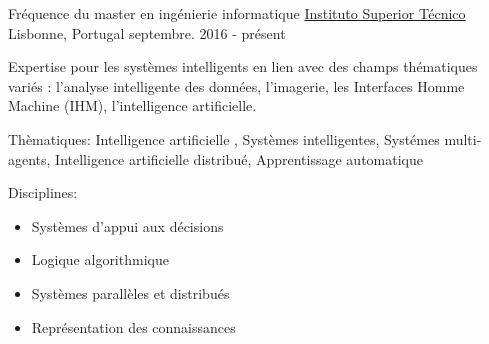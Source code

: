 


\begin{cventries}


\cventry
{Fréquence du master en ingénierie informatique} %
{\href{https://tecnico.ulisboa.pt/en/}{Instituto Superior Técnico}} %
{Lisbonne, Portugal} %
{septembre. 2016 - présent} %
{  %
\begin{cvitems}
\item {Expertise pour les systèmes intelligents en lien avec des champs thématiques variés : l’analyse intelligente des données, l’imagerie, les Interfaces Homme Machine (IHM), l’intelligence artificielle.}
\item{Thèmatiques: Intelligence artificielle , Systèmes intelligentes, Systémes multi-agents, Intelligence artificielle distribué, Apprentissage automatique}
\item{Disciplines:}
\begin{itemize}
\item Systèmes d'appui aux décisions
\item Logique algorithmique
\item Systèmes parallèles et distribués
\item Représentation des connaissances
\end{itemize}
\end{cvitems}
}



\end{cventries}
